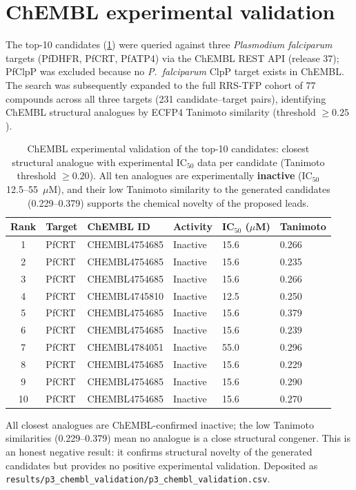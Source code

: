 \documentclass[11pt,a4paper]{article}
\begin{document}
\section{ChEMBL experimental validation}
\label{sec:chembl_validation}

The top-10 candidates (\cref{tab:chembl_validation_top10}) were queried against three \textit{Plasmodium falciparum} targets (PfDHFR, PfCRT, PfATP4) via the ChEMBL REST API (release 37); PfClpP was excluded because no \textit{P.~falciparum} ClpP target exists in ChEMBL. The search was subsequently expanded to the full RRS-TFP cohort of 77 compounds across all three targets (231 candidate--target pairs), identifying ChEMBL structural analogues by ECFP4 Tanimoto similarity (threshold $\geq 0.25$).

\begin{table}[htbp]
\centering
\caption{ChEMBL experimental validation of the top-10 candidates: closest structural analogue with experimental IC$_{50}$ data per candidate (Tanimoto threshold $\geq 0.20$). All ten analogues are experimentally \textbf{inactive} (IC$_{50}$ 12.5--55~$\mu$M), and their low Tanimoto similarity to the generated candidates (0.229--0.379) supports the chemical novelty of the proposed leads.}
\label{tab:chembl_validation_top10}
\small
\begin{tabularx}{\textwidth}{c l l l l l}
\toprule
Rank & Target & ChEMBL ID & Activity & {IC$_{50}$ ($\mu$M)} & Tanimoto \\
\midrule
1 & PfCRT & CHEMBL4754685 & Inactive & 15.6 & 0.266 \\
2 & PfCRT & CHEMBL4754685 & Inactive & 15.6 & 0.235 \\
3 & PfCRT & CHEMBL4754685 & Inactive & 15.6 & 0.266 \\
4 & PfCRT & CHEMBL4745810 & Inactive & 12.5 & 0.250 \\
5 & PfCRT & CHEMBL4754685 & Inactive & 15.6 & 0.379 \\
6 & PfCRT & CHEMBL4754685 & Inactive & 15.6 & 0.239 \\
7 & PfCRT & CHEMBL4784051 & Inactive & 55.0 & 0.296 \\
8 & PfCRT & CHEMBL4754685 & Inactive & 15.6 & 0.229 \\
9 & PfCRT & CHEMBL4754685 & Inactive & 15.6 & 0.290 \\
10 & PfCRT & CHEMBL4754685 & Inactive & 15.6 & 0.270 \\
\bottomrule
\end{tabularx}
\vspace{1mm}
\footnotesize All closest analogues are ChEMBL-confirmed inactive; the low Tanimoto similarities (0.229--0.379) mean no analogue is a close structural congener. This is an honest negative result: it confirms structural novelty of the generated candidates but provides no positive experimental validation. Deposited as \texttt{results/p3\_chembl\_validation/p3\_chembl\_validation.csv}.
\end{table}
\end{document}
